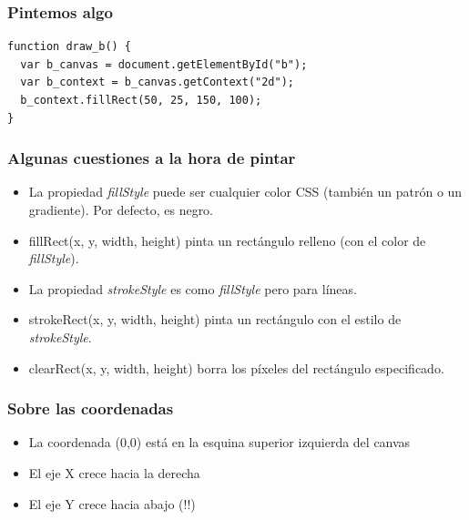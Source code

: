 \begin{frame}[fragile]
\frametitle{Pintemos algo}

\begin{verbatim}
function draw_b() {
  var b_canvas = document.getElementById("b");
  var b_context = b_canvas.getContext("2d");
  b_context.fillRect(50, 25, 150, 100);
}
\end{verbatim}

\end{frame}


\begin{frame}
\frametitle{Algunas cuestiones a la hora de pintar}

\begin{itemize}
  \item La propiedad \emph{fillStyle} puede ser cualquier color CSS (también un patrón o un gradiente). Por defecto, es negro.
  \item fillRect(x, y, width, height) pinta un rectángulo relleno (con el color de \emph{fillStyle}).
  \item La propiedad \emph{strokeStyle} es como \emph{fillStyle} pero para líneas.
  \item strokeRect(x, y, width, height) pinta un rectángulo con el estilo de \emph{strokeStyle}.
  \item clearRect(x, y, width, height) borra los píxeles del rectángulo especificado.
\end{itemize}

\end{frame}


\begin{frame}
\frametitle{Sobre las coordenadas}

\begin{itemize}
  \item La coordenada (0,0) está en la esquina superior izquierda del canvas
  \item El eje X crece hacia la derecha
  \item El eje Y crece hacia abajo (!!)
\end{itemize}

\end{frame}


